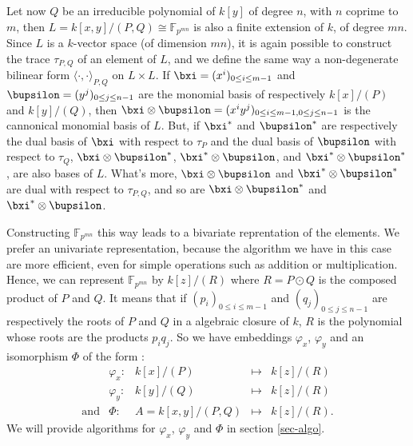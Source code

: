 \documentclass[a4paper,11pt]{article}
\theoremstyle{break}
\theoremstyle{definition}
\theoremstyle{remark}
\newcommand{\ps}[2]{\langle#1,#2\rangle}
\newcommand{\psdot}{\ps{\cdot}{\cdot}}
\begin{document}
Let now $Q$ be an irreducible polynomial of $k[y]$ of degree $n$, with $n$
coprime to $m$, then $L=k[x,y]/(P,Q)\cong \mathbb{F}_{p^{mn}}$ is also a finite 
extension of $k$, of
degree $mn$. Since $L$ is a $k$-vector space (of dimension $mn$), it is again
possible to construct the trace $\tau_{P,Q}$ of an element of $L$, and we define 
the same way
a non-degenerate bilinear form $\psdot_{P,Q}$ on $L\times L$. If
$\bxi=(x^i)_{0\leq i\leq m-1}$ and $\bupsilon=(y^j)_{0\leq j \leq n-1}$ are the
monomial basis of respectively $k[x]/(P)$ and $k[y]/(Q)$, then
$\bxi\otimes\bupsilon=(x^iy^j)_{0\leq i \leq m-1,0\leq j \leq n-1}$ is the
cannonical monomial basis of $L$. But, if $\bxi^*$ and $\bupsilon^*$ are
respectively the dual basis of $\bxi$ with respect to $\tau_P$ and the dual
basis of $\bupsilon$ with respect to $\tau_Q$, $\bxi\otimes\bupsilon^*$, 
$\bxi^*\otimes\bupsilon$, and $\bxi^*\otimes\bupsilon^*$, are also bases of $L$.
What's more, $\bxi\otimes\bupsilon$ and  $\bxi^*\otimes\bupsilon^*$ are dual
with respect to $\tau_{P,Q}$, and so are $\bxi\otimes\bupsilon^*$ and
$\bxi^*\otimes\bupsilon$.

Constructing
$\mathbb{F}_{p^{mn}}$ this way leads to a bivariate reprentation of the
elements. We prefer an univariate representation, because the algorithm we have
in this case are more efficient, even for simple operations such as addition or
multiplication. Hence, we can represent $\mathbb{F}_{p^{mn}}$ by $k[z]/(R)$
where $R=P\odot Q$ is the composed product of $P$ and $Q$. It means that if
$(p_i)_{0\leq i \leq m-1}$ and $(q_j)_{0\leq j\leq n-1}$ are respectively the
roots of $P$ and $Q$ in a algebraic closure of $k$, $R$ is the polynomial whose
roots are the products $p_iq_j$. So we have embeddings $\varphi_x$, $\varphi_y$
and an isomorphism $\Phi$ of the form :
\[
\begin{array}{ccccc}
  &\varphi_x: & k[x]/(P) & \mapsto & k[z]/(R)\\[2mm]
  & \varphi_y: & k[y]/(Q) & \mapsto & k[z]/(R)\\[2mm]
  \text{and}& \Phi:&  A=k[x,y]/(P,Q) & \mapsto & k[z]/(R).
\end{array}
\]
We will provide algorithms for $\varphi_x$, $\varphi_y$ and $\Phi$ in section
\ref{sec-algo}.
\end{document}
